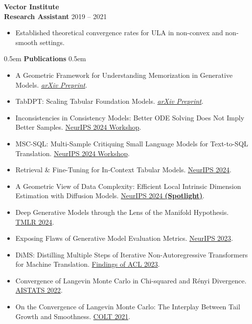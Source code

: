 \documentclass[11pt,a4paper]{article}
\newcommand{\cvsection}[1]{%
    \vspace{10pt}
    \noindent\hfill\kern0.5em
    {\Huge \textbf{\textcolor{maincolor}{#1}}}%
    \kern0.5em\hfill\vspace{8pt}
}
\begin{document}
{\Large \textbf{\textcolor{maincolor}{Vector Institute}}} \\
\textbf{Research Assistant} \hfill 2019 -- 2021
\begin{itemize}[noitemsep, topsep=4pt, leftmargin=1.5em, label=\textcolor{maincolorlight}{$\circ$}]
    \item Established theoretical convergence rates for ULA in non-convex and non-smooth settings.
\end{itemize}
\vspace{15pt}

\cvsection{Publications}
\begin{itemize}[noitemsep, topsep=4pt, leftmargin=1.5em, label=\textcolor{maincolorlight}{$\circ$}]
    \item A Geometric Framework for Understanding Memorization in Generative Models. {\textcolor{venuecolor}{\href{https://arxiv.org/abs/2411.00113}{\textit{arXiv Preprint}}}}.
    \item TabDPT: Scaling Tabular Foundation Models. {\textcolor{venuecolor}{\href{https://arxiv.org/abs/2410.18164}{\textit{arXiv Preprint}}}}.
    \item Inconsistencies in Consistency Models: Better ODE Solving Does Not Imply Better Samples. {\textcolor{venuecolor}{\href{https://openreview.net/forum?id=2p4ES8QPUi}{NeurIPS 2024 Workshop}}}.
    \item MSC-SQL: Multi-Sample Critiquing Small Language Models for Text-to-SQL Translation. {\textcolor{venuecolor}{\href{https://openreview.net/forum?id=RubZlwPv6D}{NeurIPS 2024 Workshop}}}.
    \item Retrieval \& Fine-Tuning for In-Context Tabular Models. {\textcolor{venuecolor}{\href{https://arxiv.org/abs/2406.05207}{NeurIPS 2024}}}.
    \item A Geometric View of Data Complexity: Efficient Local Intrinsic Dimension Estimation with Diffusion Models. {\textcolor{venuecolor}{\href{https://arxiv.org/abs/2406.03537}{NeurIPS 2024 \textbf{(Spotlight)}}}}.
    \item Deep Generative Models through the Lens of the Manifold Hypothesis. {\textcolor{venuecolor}{\href{https://openreview.net/forum?id=a90WpmSi0I}{TMLR 2024}}}.
    \item Exposing Flaws of Generative Model Evaluation Metrics. {\textcolor{venuecolor}{\href{https://papers.nips.cc/paper_files/paper/2023/hash/0bc795afae289ed465a65a3b4b1f4eb7-Abstract-Conference.html}{NeurIPS 2023}}}.
    \item DiMS: Distilling Multiple Steps of Iterative Non-Autoregressive Transformers for Machine Translation. {\textcolor{venuecolor}{\href{https://aclanthology.org/2023.findings-acl.542}{Findings of ACL 2023}}}.
    \item Convergence of Langevin Monte Carlo in Chi-squared and R\'enyi Divergence. {\textcolor{venuecolor}{\href{https://proceedings.mlr.press/v151/erdogdu22a.html}{AISTATS 2022}}}.
    \item On the Convergence of Langevin Monte Carlo: The Interplay Between Tail Growth and Smoothness. {\textcolor{venuecolor}{\href{https://proceedings.mlr.press/v134/erdogdu21a.html}{COLT 2021}}}.
\end{itemize}
\end{document}
